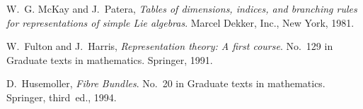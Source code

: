 \documentclass[12pt,a4paper]{article}
\begin{document}
\begin{thebibliography}{10}
W.~G. McKay and J.~Patera, {\em Tables of dimensions, indices, and branching
  rules for representations of simple {Lie} algebras}.
\newblock Marcel Dekker, Inc., New York, 1981.

W.~Fulton and J.~Harris, {\em Representation theory: A first course}.
\newblock No.~129 in Graduate texts in mathematics. Springer, 1991.

D.~Husemoller, {\em Fibre Bundles}.
\newblock No.~20 in Graduate texts in mathematics. Springer, third~ed., 1994.

\end{thebibliography}\endgroup

%
%
\end{document}
